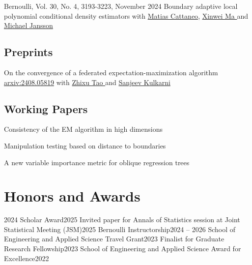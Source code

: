 \documentclass[10pt,a4paper,roman]{moderncv}        %
\begin{document}
\cventry{}
{Bernoulli, Vol. 30, No. 4, 3193-3223, November 2024}
{Boundary adaptive local polynomial conditional density estimators}
{}
{}
{with \color{blue}\href{https://cattaneo.princeton.edu}{Matias Cattaneo}\color{black},
  \color{blue}\href{https://sites.google.com/view/xinweima/home?authuser=0}{Xinwei
    Ma }\color{black}
  and
  \color{blue}\href{https://sites.google.com/berkeley.edu/michael-jansson/}{Michael
    Jansson}\color{black}
}

\subsection{Preprints}
{\vspace{-0.4cm}}
{On the convergence of a federated expectation-maximization algorithm}
{\color{blue}\href{https://arxiv.org/abs/2408.05819}{arxiv:2408.05819}\color{black}}
{}
{with
  \color{blue}\href{https://www.linkedin.com/in/zhixu-tao-a02b77199/}{Zhixu Tao }\color{black} and
  \color{blue}\href{https://www.princeton.edu/~kulkarni/}{Sanjeev Kulkarni}
}
\subsection{Working Papers}
{Consistency of the EM algorithm in high dimensions} {}{}{}

{Manipulation testing based on distance to boundaries} {}{}{}

\cventry{}{\vspace{-0.4cm}}
{A new variable importance metric for oblique regression trees} {}{}{}

\vspace{-0.3cm}
\section{Honors and Awards}
{2024 Scholar Award}{2025}
{}{}
{Invited paper for Annals of Statistics session at Joint Statistical Meeting (JSM)}{2025}
{}{}
{Bernoulli Instructorship}{2024 -- 2026}
{}{}
{School of Engineering and Applied Science Travel Grant}{2023}
{}{}
{Finalist for Graduate Research Fellowship}{2023}
{}{}
{School of Engineering and Applied Science Award for Excellence}{2022}
{}{}
\end{document}
